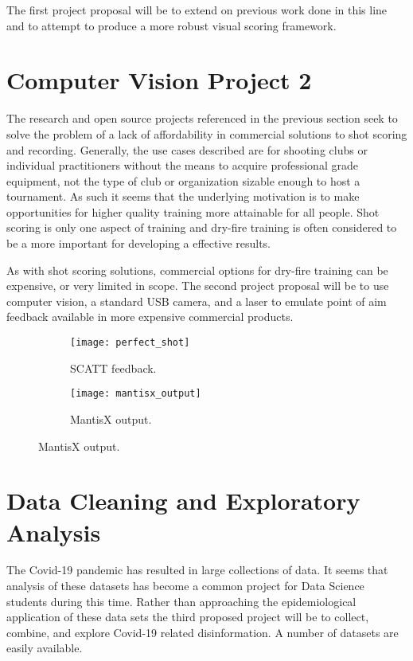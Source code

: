 \documentclass[conference]{IEEEtran}
\begin{document}
The first project proposal will be to extend on previous work done in this line and to  attempt to produce a more robust visual scoring framework.

\section{Computer Vision Project 2}

The research and open source projects referenced in the previous section seek to solve the problem of a lack of affordability in commercial solutions to shot scoring and recording.
Generally, the use cases described are for shooting clubs or individual practitioners without the means to acquire professional grade equipment, not the type of club or organization sizable enough to host a tournament.
As such it seems that the underlying motivation is to make opportunities for higher quality training more attainable for all people.
Shot scoring is only one aspect of training and dry-fire training is often \cite{Potter2017}
considered to be a more important for developing a effective results.

As with shot scoring solutions, commercial options for dry-fire training can be expensive, or very limited in scope.
The second project proposal will be to use computer vision, a standard USB camera, and a laser to emulate point of aim feedback available in more expensive 
\cite{scatt} commercial products.

\begin{figure}[h]
	\begin{subfigure}{.5\textwidth}
		\centering
		\texttt{[image: perfect\_shot]}
		\caption{SCATT \cite{scatt} feedback.}
	\end{subfigure}
	\begin{subfigure}{.5\textwidth}
		\centering
		\texttt{[image: mantisx\_output]}
		\caption{MantisX output.}
	\end{subfigure}
\end{figure}


\section{Data Cleaning and Exploratory Analysis}

The Covid-19 pandemic has resulted in large collections of data.
It seems that analysis of these datasets has become a common project for Data Science students during this time.
Rather than approaching the epidemiological application of these data sets the third proposed project will be to collect, combine, and explore Covid-19 related disinformation.
A number of datasets are easily available.
\cite{Shapiro2021}
\end{document}
